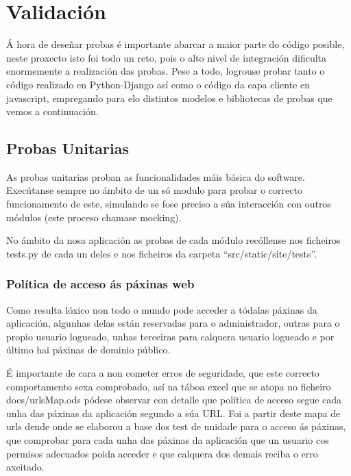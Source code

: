 \chapter{Validación}

Á hora de deseñar probas é importante abarcar a maior parte do código posible, neste proxecto isto
foi todo un reto, pois o alto nivel de integración dificulta enormemente a realización das probas.
Pese a todo, logrouse probar tanto o código realizado en Python-Django así como o código da capa 
cliente en javascript, empregando para elo distintos modelos e bibliotecas de probas que vemos a
continuación.

\section{Probas Unitarias}

    As probas unitarias proban as funcionalidades máis básica do software. Execútanse sempre no 
    ámbito de un só modulo para probar o correcto funcionamento de este, simulando se fose preciso 
    a súa interacción con outros módulos (este proceso chamase mocking).
    
    No ámbito da nosa aplicación as probas de cada módulo recóllense nos ficheiros tests.py de cada
    un deles e nos ficheiros da carpeta ``src/static/site/tests''.
    
    \subsection{Política de acceso ás páxinas web}
        Como resulta lóxico non todo o mundo pode acceder a tódalas páxinas da aplicación, algunhas
        delas están reservadas para o administrador, outras para o propio usuario logueado, unhas
        terceiras para calquera usuario logueado e por último hai páxinas de dominio público.
        
        É importante de cara a non cometer erros de seguridade, que este correcto comportamento sexa
        comprobado, así na táboa excel que se atopa no ficheiro docs/urlsMap.ods pódese observar con
        detalle que política de acceso segue cada unha das páxinas da aplicación segundo a súa URL.
        Foi a partir deste mapa de urls dende onde se elaborou a base dos test de unidade para 
        o acceso ás páxinas, que comprobar para cada unha das páxinas da aplicación que un usuario
        cos permisos adecuados poida acceder e que calquera dos demais reciba o erro axeitado.

